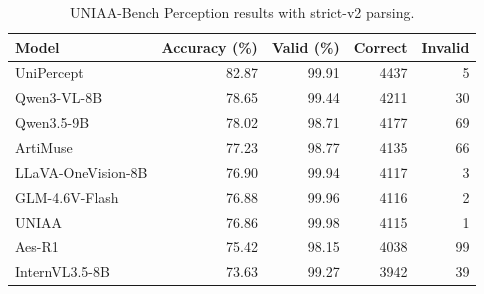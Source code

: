 \begin{table}[t]
\centering
\small
\caption{UNIAA-Bench Perception results with strict-v2 parsing.}
\begin{tabular}{lrrrr}
\toprule
Model & Accuracy (\%) & Valid (\%) & Correct & Invalid \\
\midrule
UniPercept & 82.87 & 99.91 & 4437 & 5 \\
Qwen3-VL-8B & 78.65 & 99.44 & 4211 & 30 \\
Qwen3.5-9B & 78.02 & 98.71 & 4177 & 69 \\
ArtiMuse & 77.23 & 98.77 & 4135 & 66 \\
LLaVA-OneVision-8B & 76.90 & 99.94 & 4117 & 3 \\
GLM-4.6V-Flash & 76.88 & 99.96 & 4116 & 2 \\
UNIAA & 76.86 & 99.98 & 4115 & 1 \\
Aes-R1 & 75.42 & 98.15 & 4038 & 99 \\
InternVL3.5-8B & 73.63 & 99.27 & 3942 & 39 \\
\bottomrule
\end{tabular}
\end{table}
